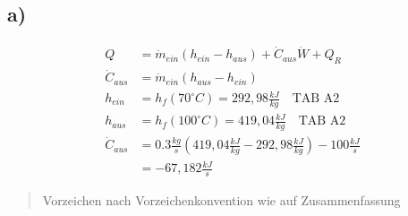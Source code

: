 

\subsection*{a)}

\begin{align*}
Q &= \dot{m}_{ein} (h_{ein} - h_{aus}) + \dot{C}_{aus} \dot{W} + Q_R \\
\dot{C}_{aus} &= \dot{m}_{ein} (h_{aus} - h_{ein}) \\
h_{ein} &= h_f (70^\circ C) = 292,98 \frac{kJ}{kg} \quad \text{TAB A2} \\
h_{aus} &= h_f (100^\circ C) = 419,04 \frac{kJ}{kg} \quad \text{TAB A2} \\
\dot{C}_{aus} &= 0.3 \frac{kg}{s} (419,04 \frac{kJ}{kg} - 292,98 \frac{kJ}{kg}) - 100 \frac{kJ}{s} \\
&= -67,182 \frac{kJ}{s}
\end{align*}

\begin{quote}
Vorzeichen nach Vorzeichenkonvention wie auf Zusammenfassung
\end{quote}